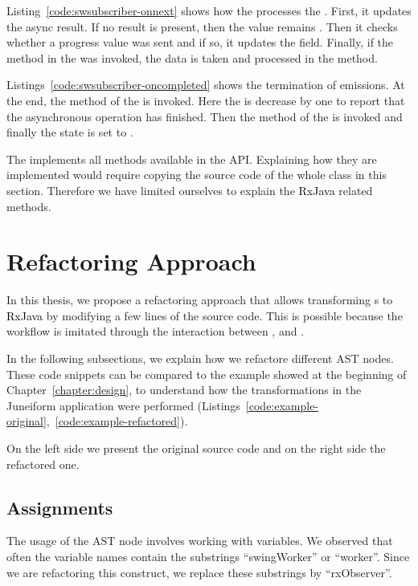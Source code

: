 \documentclass[type=bsc,accentcolor=tud9c]{tudthesis}
\newcommand{\framework}[1]{\textcolor{black}{#1}}
\begin{document}


Listing~\ref{code:swsubscriber-onnext} shows how the  processes the . First, it updates the async result. If no result is present, then the value remains . Then it checks whether a progress value was sent and if so, it updates the  field. Finally, if the  method in the  was invoked, the data is taken and processed in the  method.

Listings~\ref{code:swsubscriber-oncompleted} shows the termination of emissions. At the end, the  method of the  is invoked. Here the  is decrease by one to report that the asynchronous operation has finished. Then the  method of the  is invoked and finally the state is set to .



The  implements all methods available in the  API. Explaining how they are implemented would require copying the source code of the whole class in this section. Therefore we have limited ourselves to explain the \framework{RxJava} related methods.


\section{Refactoring Approach}
\label{sec:refactoring-approach}
In this thesis, we propose a refactoring approach that allows transforming s to \framework{RxJava} by modifying a few lines of the source code. This is possible because the  workflow is imitated through the interaction between ,  and .

In the following subsections, we explain how we refactore different AST nodes. These code snippets can be compared to the example showed at the beginning of Chapter~\ref{chapter:design}, to understand how the transformations in the Juneiform application were performed (Listings~\ref{code:example-original},~\ref{code:example-refactored}).

On the left side we present the original source code and on the right side the refactored one.

\subsection{Assignments}
\label{sec:imp-assigments}
The usage of the AST node  involves working with variables. We observed that often the variable names contain the substrings ``swingWorker'' or     ``worker''. Since we are refactoring this construct, we replace these substrings by ``rxObserver''.
\end{document}
